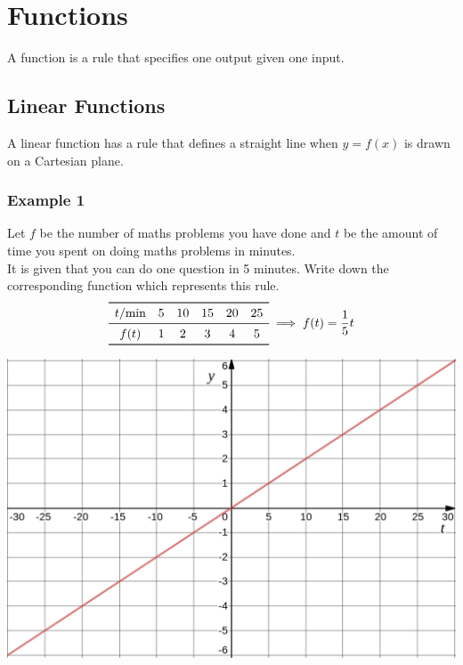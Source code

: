 \documentclass[a4paper,12pt]{article}
\begin{document}
\section{Functions}
A function is a rule that specifies one output given one input.
\subsection{Linear Functions}
A linear function has a rule that defines a straight line when \(y=f(x)\)
is drawn on a Cartesian plane.
\subsubsection{Example 1}
Let \(f\) be the number of maths problems you have done
and \(t\) be the amount of time you spent on doing maths problems in minutes.\\
It is given that you can do one question in 5 minutes. 
Write down the corresponding function which represents this rule.
\[\begin{array}{cccccc}
    \toprule
    t/\text{min}&5&10&15&20&25\\
    \midrule
    f(t)&1&2&3&4&5\\
    \bottomrule
\end{array}
\implies{}
f (t)=\frac15t\]
\begin{center}
\includegraphics[width=.99\textwidth]{linear.png}
\end{center}
\end{document}
